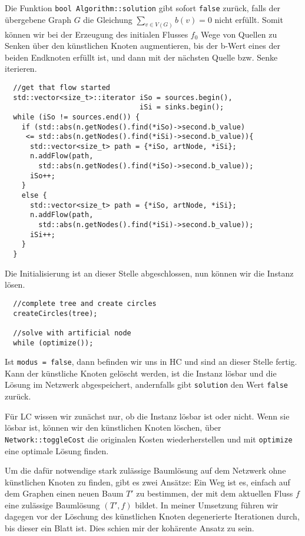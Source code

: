Die Funktion \lstinline|bool Algorithm::solution| gibt sofort \lstinline|false| zurück, falls der übergebene Graph $G$ die Gleichung $\sum_{v\in V(G)} b(v)=0$ nicht erfüllt. Somit können wir bei der Erzeugung des initialen Flusses $f_0$ Wege von Quellen zu Senken über den künstlichen Knoten augmentieren, bis der b-Wert eines der beiden Endknoten erfüllt ist, und dann mit der nächsten Quelle bzw. Senke iterieren.

\begin{lstlisting}
  //get that flow started
  std::vector<size_t>::iterator iSo = sources.begin(),
                                iSi = sinks.begin();
  while (iSo != sources.end()) {
    if (std::abs(n.getNodes().find(*iSo)->second.b_value)
     <= std::abs(n.getNodes().find(*iSi)->second.b_value)){
      std::vector<size_t> path = {*iSo, artNode, *iSi};
      n.addFlow(path,
        std::abs(n.getNodes().find(*iSo)->second.b_value));
      iSo++;
    }
    else {
      std::vector<size_t> path = {*iSo, artNode, *iSi};
      n.addFlow(path,
        std::abs(n.getNodes().find(*iSi)->second.b_value));
      iSi++;
    }
  }
\end{lstlisting}

Die Initialisierung ist an dieser Stelle abgeschlossen, nun können wir die Instanz lösen.

\begin{lstlisting}
  //complete tree and create circles
  createCircles(tree);

  //solve with artificial node
  while (optimize());
\end{lstlisting}

Ist \lstinline|modus = false|, dann befinden wir uns in HC und sind an dieser Stelle fertig. Kann der künstliche Knoten gelöscht werden, ist die Instanz lösbar und die Lösung im Netzwerk abgespeichert, andernfalls gibt \lstinline|solution| den Wert \lstinline|false| zurück.

Für LC wissen wir zunächst nur, ob die Instanz lösbar ist oder nicht. Wenn sie lösbar ist, können wir den künstlichen Knoten löschen, über \lstinline|Network::toggleCost| die originalen Kosten wiederherstellen und mit \lstinline|optimize| eine optimale Lösung finden.

Um die dafür notwendige stark zulässige Baumlösung auf dem Netzwerk ohne künstlichen Knoten zu finden, gibt es zwei Ansätze: Ein Weg ist es, einfach auf dem Graphen einen neuen Baum $T'$ zu bestimmen, der mit dem aktuellen Fluss $f$ eine zulässige Baumlösung $(T',f)$ bildet. In meiner Umsetzung führen wir dagegen vor der Löschung des künstlichen Knoten degenerierte Iterationen durch, bis dieser ein Blatt ist. Dies schien mir der kohärente Ansatz zu sein.

